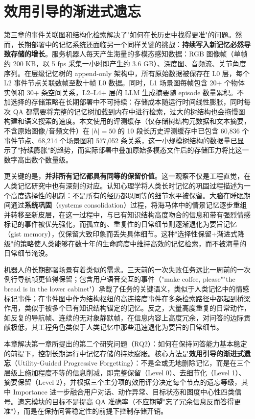 
\chapter{效用引导的渐进式遗忘}

第三章的事件关联图和结构化检索解决了"如何在长历史中找得更准"的问题。然而，长期部署中的记忆系统还面临另一个同样关键的挑战：\textbf{持续写入新记忆必然导致存储的增长}。服务机器人每天产生海量的多模态感知数据：RGB 图像帧（单帧约 200 KB，以 5 fps 采集一小时即产生约 3.6 GB）、深度图、音频流、关节角度序列。在层级记忆树的 append-only 架构中，所有原始数据被保存在 L0 层，每个 L2 事件节点关联数帧至数十帧 L0 数据。同时，L1 场景图每帧包含 20+ 个物体实例和 30+ 条空间关系，L2–L4+ 层的 LLM 生成摘要随 episode 数量累积。不加选择的存储策略在长期部署中不可持续：存储成本随运行时间线性膨胀，同时每次 QA 都需要将完整的记忆树加载到内存中进行检索，过大的树结构也会拖慢图构建和语义搜索的速度。本文使用的评测缓存（仅存储树结构元数据和文本摘要，不含原始图像/音频文件）在 $|h|=50$ 的 10 段长历史评测缓存中已包含 60,836 个事件节点、68,214 个场景图和 577,052 条关系，这一小规模树结构的数据量已显示了"持续膨胀"的趋势，而实际部署中叠加原始多模态文件后的存储压力将比这一数字高出数个数量级。

更关键的是，\textbf{并非所有记忆都具有同等的保留价值}。这一观察不仅是工程直觉，在人类记忆研究中也有深刻的对应。认知心理学将人类长时记忆的巩固过程描述为一个高度选择性的机制：不是所有的经历都以同等的细节水平被保留。大脑在睡眠期间通过\textbf{系统巩固}（systems consolidation）过程\cite{mcclelland1995complementary,nadel1997memory}，将海马体中的情景记忆逐步重组并转移至新皮层，在这一过程中，与已有知识结构高度吻合的信息和带有强烈情感标记的事件被优先强化，而孤立的、重复性的日常细节则逐渐退化为要旨记忆（gist memory），仅保留大致印象而丢失具体细节。这种"选择性保留+渐进式降级"的策略使人类能够在数十年的生命跨度中维持高效的记忆检索，而不被海量的日常细节淹没。

机器人的长期部署场景有着类似的需求。三天前的一次失败任务远比一周前的一次例行导航帧更值得保留；包含用户语音交互的事件（"make coffee, please""the bread is in the lower cabinet"）承载了任务的关键语义，类似于人类记忆中的情感标记事件；在事件图中作为结构枢纽的高连接度事件在多条检索路径中都起到桥梁作用，类似于被多个已有知识结构锚定的记忆。反之，大量高度重复的日常动作，如反复的导航帧、连续的无对象静默帧，在信息内容上高度冗余，对问答的边际贡献极低，其工程角色类似于人类记忆中那些迅速退化为要旨的日常细节。

本章解决第一章所提出的第二个研究问题（RQ2）：如何在保持问答能力基本稳定的前提下，控制长期运行中记忆存储的持续膨胀。核心方法是\textbf{效用引导的渐进式遗忘}（Utility-Guided Progressive Forgetting）：不是全或无地删除记忆，而是在三个层级上施加程度不等的信息削减，即完整保留（Level 0）、去细节化（Level 1）、摘要保留（Level 2），并根据三个主分项的效用评分决定每个节点的遗忘等级，其中 Importance 进一步融合用户对话、动作异常、目标状态和图度中心性四类信号。遗忘模块的目标不是提高 QA 准确率（不应期望"忘了冗余信息反而答得更准"），而是在保持问答稳定性的前提下控制存储开销。

